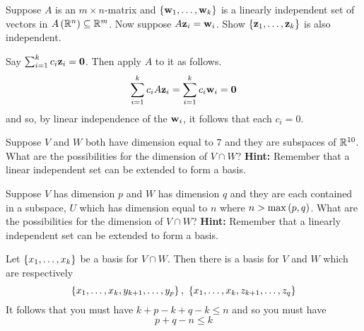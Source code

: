 \begin{enumialphparenastyle}
\begin{ex}
  Suppose $A$ is an $m\times n$-matrix and $\left\{\mbox{\bf w}
    _{1},\ldots,\mbox{\bf w}_{k}\right\} $ is a linearly independent set of
  vectors in $A\left(\mathbb{R}^{n}\right) \subseteq \mathbb{R}^{m}$. Now
  suppose $A\mbox{\bf z}_{i}=\mbox{\bf w}_{i}$. Show $\left\{
    \mbox{\bf z}_{1},\ldots,\mbox{\bf z}_{k}\right\} $ is also independent. 
  \begin{sol}
    Say $
    \sum_{i=1}^{k}c_{i}\mbox{\bf z}_{i}=\mbox{\bf 0}$. Then apply $A$ to it as follows.
    \begin{equation*}
      \sum_{i=1}^{k}c_{i}A\mbox{\bf z}_{i}=\sum_{i=1}^{k}c_{i}\mbox{\bf w}_{i}=\mbox{\bf 0}
    \end{equation*}
    and so, by linear independence of the $\mbox{\bf w}_{i}$, it follows that each
    $c_{i}=0$.
  \end{sol}
\end{ex}

\begin{ex}
  Suppose $V$ and $W$ both have dimension equal to $7$ and they are
  subspaces of $\mathbb{R}^{10}$. What are the possibilities for the dimension
  of $V\cap W$? \textbf{Hint: }Remember that a linear independent set can be
  extended to form a basis. \vspace{1mm}
\end{ex}

\begin{ex}
  Suppose $V$ has dimension $p$ and $W$ has dimension $q$ and they
  are each contained in a subspace, $U$ which has dimension equal to $n$ where 
  $n>\max \left(p,q\right)$. What are the possibilities for the dimension of 
  $V\cap W$? \textbf{Hint: }Remember that a linearly independent set can be
  extended to form a basis. \vspace{1mm}
  \begin{sol}
    Let $\left\{x_{1},\ldots,x_{k}\right\} $ be a
    basis for $V\cap W$. Then there is a basis for $V$ and $W$ which are
    respectively
    \begin{equation*}
      \set{x_{1},\ldots,x_{k},y_{k+1},\ldots,y_{p}},\ \set{
        x_{1},\ldots,x_{k},z_{k+1},\ldots,z_{q}}
    \end{equation*}
    It follows that you must have $k+p-k+q-k\leq n$ and so you must have
    \begin{equation*}
      p+q-n\leq k
    \end{equation*}
  \end{sol}
\end{ex}


\end{enumialphparenastyle}
